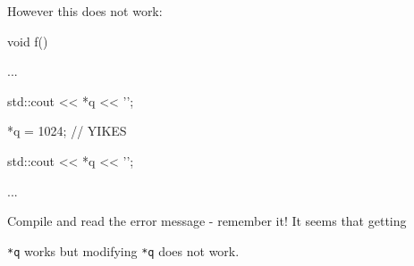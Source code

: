 However this does not work:



\begin{consolethree}[escapeinside=||]

void f()

{

    ...

    std::cout << *q << '\n';

    *q = 1024;                  // YIKES

    std::cout << *q << '\n';

    ...

}

\end{consolethree}



Compile and read the error message - remember it! It seems that getting

\texttt{*q} works but modifying \texttt{*q} does not work.

